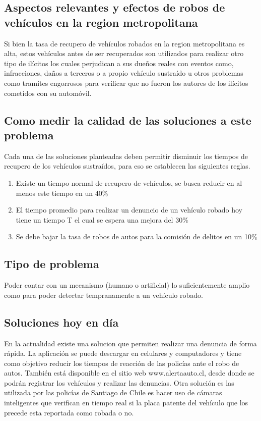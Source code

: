 \documentclass[12pt,letterpaper]{article}
\begin{document}
\subsection{Aspectos relevantes y efectos de robos de vehículos en la region metropolitana}
Si bien la tasa de recupero de vehículos robados en la region metropolitana es alta, estos vehículos antes de ser recuperados son utilizados para realizar otro tipo de ilícitos los cuales perjudican a sus dueños reales con eventos como, infracciones, daños a terceros o a propio vehículo sustraído u otros problemas como tramites engorrosos para verificar que no fueron los autores de los ilícitos cometidos con su automóvil.

\subsection{Como medir la calidad de las soluciones a este problema}
Cada una de las soluciones planteadas deben permitir disminuir los tiempos de recupero de los vehículos sustraídos, para eso se establecen las siguientes reglas.

\begin{enumerate}
\item Existe un tiempo normal de recupero de vehículos, se busca reducir en al menos este tiempo en un 40\%
\item El tiempo promedio para realizar un denuncio de un vehículo robado hoy tiene un tiempo T el cual se espera una mejora del 30\%
\item Se debe bajar la tasa de robos de autos para la comisión de delitos en un 10\%
\end{enumerate}

\subsection{Tipo de problema}
Poder contar con un mecanismo (humano o artificial) lo suficientemente amplio como para poder detectar tempranamente a un vehículo robado.

\subsection{Soluciones hoy en día}
En la actualidad existe una solucion que permiten realizar una denuncia de forma rápida. La aplicación se puede descargar en celulares y computadores y tiene como objetivo reducir los tiempos de reacción de las policías ante el robo de autos. También está disponible en el sitio web www.alertaauto.cl, desde donde se podrán registrar los vehículos y realizar las denuncias.
Otra solución es las utilizada por las policías de Santiago de Chile es hacer uso de cámaras inteligentes\autocite{recono} que verifican en tiempo real si la placa patente del vehículo que los precede esta reportada como robada o no.
\end{document}
